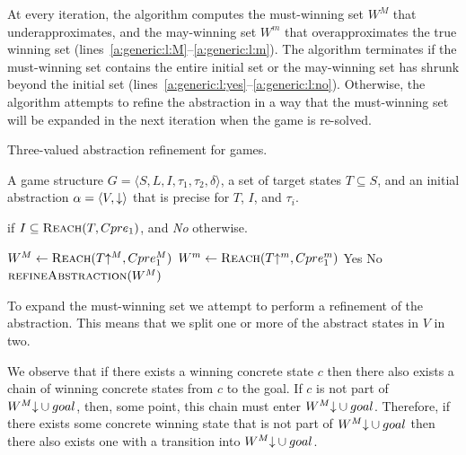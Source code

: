 At every iteration, the algorithm computes the must-winning set $W^M$ that underapproximates, and the may-winning set $W^m$ that overapproximates the true winning set (lines~\ref{a:generic:l:M}--\ref{a:generic:l:m}). The algorithm terminates if the must-winning set contains the entire initial set or the may-winning set has shrunk beyond the initial set (lines~\ref{a:generic:l:yes}--\ref{a:generic:l:no}).  Otherwise, the algorithm attempts to refine the abstraction in a way that the must-winning set will be expanded in the next iteration when the game is re-solved.

\begin{algorithm}
\caption{Three-valued abstraction refinement for games.}
\label{alg:generic}

\begin{algorithmic}[1]

\Require A game structure $G = \langle S, L, I, \tau_1, \tau_2, \delta \rangle$, a set of target states $T\subseteq S$, and an initial abstraction $\alpha=\langle V, \mathord{\downarrow} \rangle$ that is precise for $T$, $I$, and $\tau_i$.

 if $I \subseteq \textsc{Reach}(T, Cpre_1)$, and {\it No} otherwise.

    \Loop
        \State $W^M \gets \textsc{Reach}(T\mathord{\uparrow^M}, Cpre_1^M)$ \label{a:generic:l:M}
        \State $W^m \gets \textsc{Reach}(T\mathord{\uparrow^m}, Cpre_1^m)$ \label{a:generic:l:m}
         \label{alg:tvg:tc1}
            \State\Return Yes \label{a:generic:l:yes}
         \label{alg:tvg:tc2}
            \State\Return No \label{a:generic:l:no}
        \Else       
            \State$\Call{refineAbstraction}{W^M}$
        \EndIf
    \EndLoop
\EndFunction

\end{algorithmic}
\end{algorithm}

To expand the must-winning set we attempt to perform a refinement of the abstraction. This means that we split one or more of the abstract states in $V$ in two. 

We observe that if there exists a winning concrete state $c$ then there also exists a chain of winning concrete states from $c$ to the goal. If $c$ is not part of $W^M\mathord{\downarrow} \cup goal$, then, some point, this chain must enter $W^M\mathord{\downarrow} \cup goal$. Therefore, if there exists some concrete winning state that is not part of $W^M\mathord{\downarrow} \cup goal$ then there also exists one with a transition into $W^M\mathord{\downarrow} \cup goal$. 

